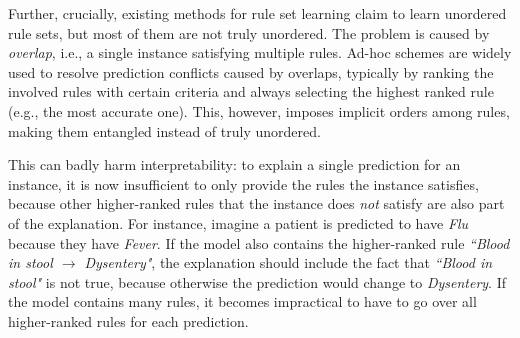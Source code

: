 Further, crucially, existing methods for rule set learning claim to learn unordered rule sets, but most of them are not truly unordered. The problem is caused by \emph{overlap}, i.e., a single instance satisfying multiple rules. Ad-hoc schemes are widely used to resolve prediction conflicts caused by overlaps, typically by ranking the involved rules with certain criteria and always selecting the highest ranked rule \citep{zhang2020diverseRuleSets,lakkaraju2016interpretable} (e.g., the most accurate one). This, however, imposes implicit orders among rules, making them entangled instead of truly unordered. 

This can badly harm interpretability: to explain a single prediction for an instance, it is now insufficient to only provide the rules the instance satisfies, because other higher-ranked rules that the instance does \emph{not} satisfy are also part of the explanation. For instance, imagine a patient is predicted to have \emph{Flu} because they have \emph{Fever}. If the model also contains the higher-ranked rule \emph{``Blood in stool $\rightarrow$ Dysentery"}, the explanation should include the fact that \emph{``Blood in stool"} is not true, because otherwise the prediction would change to \emph{Dysentery}. If the model contains many rules, it becomes impractical to have to go over all higher-ranked rules for each prediction. 

